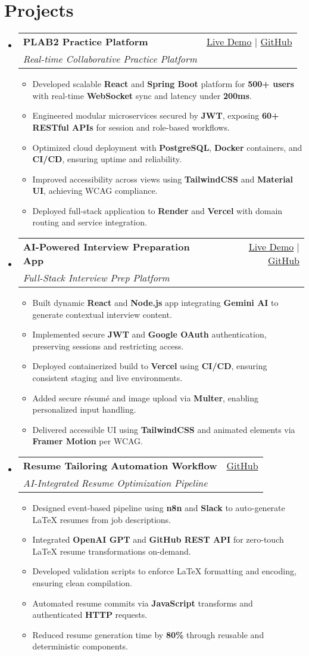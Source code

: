 \documentclass[letterpaper,11pt]{article}
\makeatletter
\newcommand{\resumeItem}[1]{\item\small{#1 \vspace{-2pt}}}
\newcommand{\resumeSubheading}[4]{
  \vspace{-1pt}\item
    \begin{tabular*}{0.97\textwidth}[t]{l@{\extracolsep{\fill}}r}
      \textbf{#1} & #2 \\
      \textit{\small#3} & \textit{\small #4} \\
    \end{tabular*}\vspace{-5pt}
}
\newcommand{\resumeSubHeadingListStart}{\begin{itemize}[leftmargin=*]}
\newcommand{\resumeSubHeadingListEnd}{\end{itemize}}
\newcommand{\resumeItemListStart}{\begin{itemize}}
\newcommand{\resumeItemListEnd}{\end{itemize}\vspace{-5pt}}
\makeatother
\begin{document}
\section{Projects}
  \resumeSubHeadingListStart
    \resumeSubheading
      {\textbf{PLAB2 Practice Platform}}{\href{https://plab2practice.com}{Live Demo} | \href{https://github.com/altansaid/plab2projectnew}{GitHub}}
      {Real-time Collaborative Practice Platform}{}
      \resumeItemListStart
        \resumeItem{Developed scalable \textbf{React} and \textbf{Spring Boot} platform for \textbf{500+ users} with real-time \textbf{WebSocket} sync and latency under \textbf{200ms}.}
        \resumeItem{Engineered modular microservices secured by \textbf{JWT}, exposing \textbf{60+ RESTful APIs} for session and role-based workflows.}
        \resumeItem{Optimized cloud deployment with \textbf{PostgreSQL}, \textbf{Docker} containers, and \textbf{CI/CD}, ensuring uptime and reliability.}
        \resumeItem{Improved accessibility across views using \textbf{TailwindCSS} and \textbf{Material UI}, achieving WCAG compliance.}
        \resumeItem{Deployed full-stack application to \textbf{Render} and \textbf{Vercel} with domain routing and service integration.}
      \resumeItemListEnd

    \resumeSubheading
      {\textbf{AI-Powered Interview Preparation App}}{\href{https://interviewcoach-ai.vercel.app}{Live Demo} | \href{https://github.com/altansaid/interviewcoach-ai}{GitHub}}
      {Full-Stack Interview Prep Platform}{}
      \resumeItemListStart
        \resumeItem{Built dynamic \textbf{React} and \textbf{Node.js} app integrating \textbf{Gemini AI} to generate contextual interview content.}
        \resumeItem{Implemented secure \textbf{JWT} and \textbf{Google OAuth} authentication, preserving sessions and restricting access.}
        \resumeItem{Deployed containerized build to \textbf{Vercel} using \textbf{CI/CD}, ensuring consistent staging and live environments.}
        \resumeItem{Added secure résumé and image upload via \textbf{Multer}, enabling personalized input handling.}
        \resumeItem{Delivered accessible UI using \textbf{TailwindCSS} and animated elements via \textbf{Framer Motion} per WCAG.}
      \resumeItemListEnd

    \resumeSubheading
      {\textbf{Resume Tailoring Automation Workflow}}{\href{https://github.com/altansaid/resume-updates}{GitHub}}{AI-Integrated Resume Optimization Pipeline}{}
      \resumeItemListStart
        \resumeItem{Designed event-based pipeline using \textbf{n8n} and \textbf{Slack} to auto-generate LaTeX resumes from job descriptions.}
        \resumeItem{Integrated \textbf{OpenAI GPT} and \textbf{GitHub REST API} for zero-touch LaTeX resume transformations on-demand.}
        \resumeItem{Developed validation scripts to enforce LaTeX formatting and encoding, ensuring clean compilation.}
        \resumeItem{Automated resume commits via \textbf{JavaScript} transforms and authenticated \textbf{HTTP} requests.}
        \resumeItem{Reduced resume generation time by \textbf{80\%} through reusable and deterministic components.}
      \resumeItemListEnd
  \resumeSubHeadingListEnd
\end{document}
